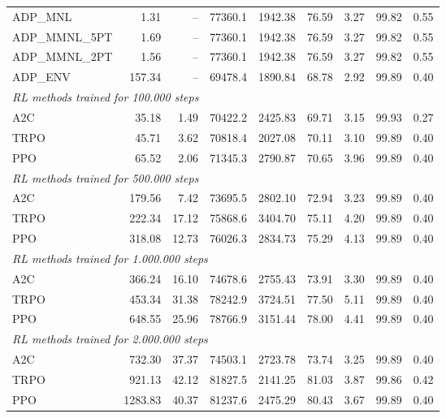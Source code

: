 \begin{samepage}
\begin{center}
\begin{tabular}{l|rr|rr|rr|rr}
    \midrule
    ADP\_MNL     &     1.31 &    -- &    77360.1 &    1942.38 &   76.59 &    3.27 &   99.82 &    0.55 \\
    ADP\_MMNL\_5PT &     1.69 &    -- &    77360.1 &    1942.38 &   76.59 &    3.27 &   99.82 &    0.55 \\
    ADP\_MMNL\_2PT &     1.56 &    -- &    77360.1 &    1942.38 &   76.59 &    3.27 &   99.82 &    0.55 \\
    ADP\_ENV     &   157.34 &    -- &    69478.4 &    1890.84 &   68.78 &    2.92 &   99.89 &    0.40 \\
    \midrule
    \multicolumn{9}{l}{\textit{RL methods trained for 100.000 steps}} \\
    \midrule
    A2C          &    35.18 &     1.49 &    70422.2 &    2425.83 &   69.71 &    3.15 &   99.93 &    0.27 \\
    TRPO         &    45.71 &     3.62 &    70818.4 &    2027.08 &   70.11 &    3.10 &   99.89 &    0.40 \\
    PPO          &    65.52 &     2.06 &    71345.3 &    2790.87 &   70.65 &    3.96 &   99.89 &    0.40 \\
    \midrule
    \multicolumn{9}{l}{\textit{RL methods trained for 500.000 steps}} \\
    \midrule
    A2C          &   179.56 &     7.42 &    73695.5 &    2802.10 &   72.94 &    3.23 &   99.89 &    0.40 \\
    TRPO         &   222.34 &    17.12 &    75868.6 &    3404.70 &   75.11 &    4.20 &   99.89 &    0.40 \\
    PPO          &   318.08 &    12.73 &    76026.3 &    2834.73 &   75.29 &    4.13 &   99.89 &    0.40 \\
    \midrule
    \multicolumn{9}{l}{\textit{RL methods trained for 1.000.000 steps}} \\
    \midrule
    A2C          &   366.24 &    16.10 &    74678.6 &    2755.43 &   73.91 &    3.30 &   99.89 &    0.40 \\
    TRPO         &   453.34 &    31.38 &    78242.9 &    3724.51 &   77.50 &    5.11 &   99.89 &    0.40 \\
    PPO          &   648.55 &    25.96 &    78766.9 &    3151.44 &   78.00 &    4.41 &   99.89 &    0.40 \\
    \midrule
    \multicolumn{9}{l}{\textit{RL methods trained for 2.000.000 steps}} \\
    \midrule
    A2C          &   732.30 &    37.37 &    74503.1 &    2723.78 &   73.74 &    3.25 &   99.89 &    0.40 \\
    TRPO         &   921.13 &    42.12 &    81827.5 &    2141.25 &   81.03 &    3.87 &   99.86 &    0.42 \\
    PPO          &  1283.83 &    40.37 &    81237.6 &    2475.29 &   80.43 &    3.67 &   99.89 &    0.40 \\
    \bottomrule
  \end{tabular}
\end{center}
\end{samepage}

